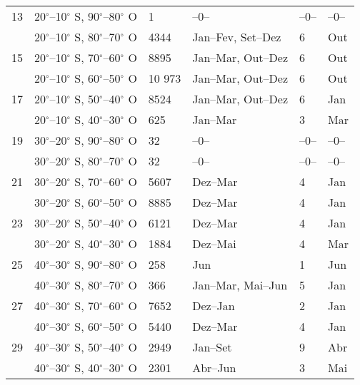 \begin{table}[!ht]
\begin{tabularx}{\textwidth}{p{0.6cm} p{3.5cm} W W W W}
13&20$^{\circ}$--10$^{\circ}$ S, 90$^{\circ}$--80$^{\circ}$ O& 1  &   --0--  & --0-- & --0-- \\[1.5pt]&20$^{\circ}$--10$^{\circ}$ S, 80$^{\circ}$--70$^{\circ}$ O& 4344 & Jan--Fev,  Set--Dez  &6& Out\\[1.5pt]
15&20$^{\circ}$--10$^{\circ}$ S, 70$^{\circ}$--60$^{\circ}$ O& 8895 & Jan--Mar, Out--Dez &6& Out\\[1.5pt]&20$^{\circ}$--10$^{\circ}$ S, 60$^{\circ}$--50$^{\circ}$ O& 10 973 & Jan--Mar,  Out--Dez &6& Out\\[1.5pt]
17&20$^{\circ}$--10$^{\circ}$ S, 50$^{\circ}$--40$^{\circ}$ O& 8524 & Jan--Mar, Out--Dez &6&  Jan\\[1.5pt]&20$^{\circ}$--10$^{\circ}$ S, 40$^{\circ}$--30$^{\circ}$ O& 625  & Jan--Mar &3&  Mar\\[1.5pt]

19&30$^{\circ}$--20$^{\circ}$ S, 90$^{\circ}$--80$^{\circ}$ O& 32 & --0-- & --0-- &  --0-- \\[1.5pt]&30$^{\circ}$--20$^{\circ}$ S, 80$^{\circ}$--70$^{\circ}$ O& 32 & --0-- &--0--&  --0--\\[1.5pt]
21&30$^{\circ}$--20$^{\circ}$ S, 70$^{\circ}$--60$^{\circ}$ O& 5607 & Dez--Mar &4& Jan\\[1.5pt]&30$^{\circ}$--20$^{\circ}$ S, 60$^{\circ}$--50$^{\circ}$ O& 8885  & Dez--Mar &4& Jan\\[1.5pt]
23&30$^{\circ}$--20$^{\circ}$ S, 50$^{\circ}$--40$^{\circ}$ O& 6121 & Dez--Mar &4& Jan\\[1.5pt]&30$^{\circ}$--20$^{\circ}$ S, 40$^{\circ}$--30$^{\circ}$ O& 1884 & Dez--Mai&4&  Mar\\[1.5pt]

25&40$^{\circ}$--30$^{\circ}$ S, 90$^{\circ}$--80$^{\circ}$ O& 258 & Jun &1&  Jun \\[1.5pt]&40$^{\circ}$--30$^{\circ}$ S, 80$^{\circ}$--70$^{\circ}$ O& 366 & Jan--Mar, Mai--Jun &5& Jan \\[1.5pt]
27&40$^{\circ}$--30$^{\circ}$ S, 70$^{\circ}$--60$^{\circ}$ O& 7652 & Dez--Jan &2&  Jan\\[1.5pt]&40$^{\circ}$--30$^{\circ}$ S, 60$^{\circ}$--50$^{\circ}$ O& 5440 & Dez--Mar  &4&  Jan\\[1.5pt]
29&40$^{\circ}$--30$^{\circ}$ S, 50$^{\circ}$--40$^{\circ}$ O& 2949 & Jan--Set &9&  Abr\\[1.5pt]&40$^{\circ}$--30$^{\circ}$ S, 40$^{\circ}$--30$^{\circ}$ O& 2301 & Abr--Jun  &3& Mai\\[1.5pt]


\hline 
\end{tabularx}
\end{table}
 
